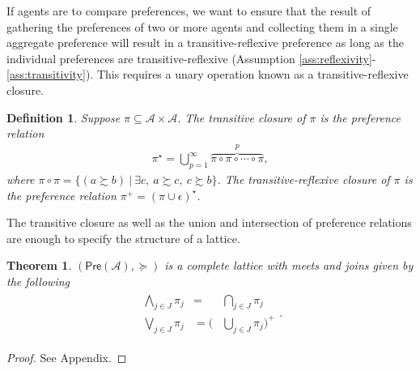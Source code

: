 \documentclass[conference]{ieeeconf}
\newcommand{\powerset}[1]{2^{#1}}
\newcommand{\A}{\mathcal{A}}
\newcommand{\X}{\mathcal{X}}
\newcommand{\Pref}{\mathsf{Pre}}
\newcommand{\prefers}{\succsim}
\newcommand{\join}{\vee}
\newcommand{\meet}{\wedge}
\newcommand{\bigjoin}{\bigvee}
\newcommand{\bigmeet}{\bigwedge}
\DeclareMathOperator{\cl}{cl}
\DeclareMathOperator{\Cl}{Cl}
\newtheorem{theorem}{Theorem}
\newtheorem{definition}{Definition}
\begin{document}
If agents are to compare preferences, we want to ensure that the result of gathering the preferences of two or more agents and collecting them in a single aggregate preference will result in a transitive-reflexive preference as long as the individual preferences are transitive-reflexive (Assumption \ref{ass:reflexivity}-\ref{ass:transitivity}). This requires a unary operation known as a transitive-reflexive closure.
\begin{definition}
    Suppose $\pi \subseteq \A \times \A$. The \emph{transitive closure} of $\pi$ is the preference relation 
\begin{align}
    \pi^{\star} = \bigcup_{p=1}^{\infty} \overbrace{\pi \circ \pi \circ \cdots \circ \pi}^{p}, \label{eq:transitive-closure}
\end{align}
where $\pi \circ \pi = \{ (a \prefers b)~\vert~\exists c,~a \prefers c,~c \prefers b\}$. The \emph{transitive-reflexive closure} of $\pi$ is the preference relation $\pi^{+} = \left( \pi \cup \epsilon \right)^\star$.
\end{definition}


The transitive closure as well as the union and intersection of preference relations are enough to specify the structure of a lattice.

\begin{theorem} \label{thm:complete-lattice}
    $(\Pref(\A), \succeq)$ is a complete lattice with meets and joins given by the following
    \leavevmode
    \begin{align}
    \begin{aligned}
        \bigmeet_{j \in J} \pi_j & = &\bigcap_{j \in J} \pi_j \\
        \bigjoin_{j \in J} \pi_j & = \biggl( &\bigcup_{j \in J} \pi_j \biggr)^{+}
    \end{aligned}.\label{eq:meets-joins}
\end{align}
\end{theorem}
\begin{proof}
    See Appendix.
\end{proof}
\end{document}
